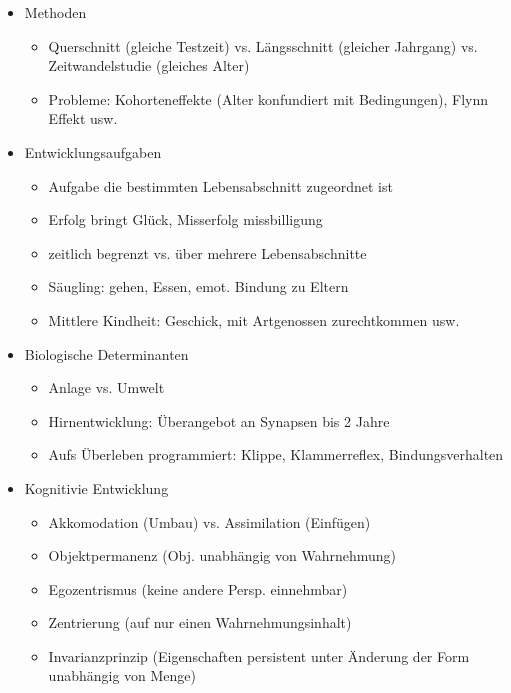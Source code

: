 \documentclass[11pt, paper=a4, twocolumn]{scrartcl}
\begin{document}
	\begin{itemize}
		\item Methoden
			\begin{itemize}
				\item Querschnitt (gleiche Testzeit) vs. Längsschnitt 
					(gleicher Jahrgang) vs. Zeitwandelstudie
					(gleiches Alter)
				\item Probleme: Kohorteneffekte (Alter konfundiert mit 
					Bedingungen), Flynn Effekt usw.
			\end{itemize}

		\item Entwicklungsaufgaben
			\begin{itemize}
				\item Aufgabe die bestimmten Lebensabschnitt zugeordnet 
					ist
				\item Erfolg bringt Glück, Misserfolg missbilligung
				\item zeitlich begrenzt vs. über mehrere Lebensabschnitte
				\item Säugling: gehen, Essen, emot. Bindung zu Eltern
				\item Mittlere Kindheit: Geschick, mit Artgenossen 
					zurechtkommen usw.
			\end{itemize}

		\item Biologische Determinanten
			\begin{itemize}
				\item Anlage vs. Umwelt
				\item Hirnentwicklung: Überangebot an Synapsen bis 2 Jahre 
				\item Aufs Überleben \glqq{}programmiert\grqq{}: Klippe, 
					Klammerreflex, Bindungsverhalten
			\end{itemize}

		\item Kognitivie Entwicklung
			\begin{itemize}
				\item Akkomodation (Umbau) vs. Assimilation (Einfügen)
				\item Objektpermanenz (Obj. unabhängig von Wahrnehmung)
				\item Egozentrismus (keine andere Persp. einnehmbar)
				\item Zentrierung (auf nur einen Wahrnehmungsinhalt)
				\item Invarianzprinzip (Eigenschaften persistent unter 
					Änderung der Form unabhängig von Menge)
			\end{itemize}


\end{itemize}
\end{document}
